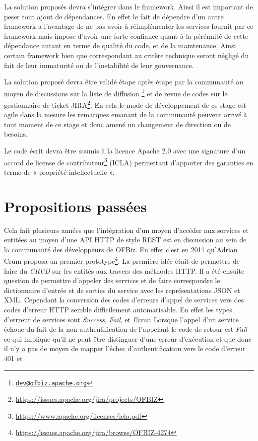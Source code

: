 \documentclass[a4paper, 11pt]{report}
\begin{document}
La solution proposés devra s'intégrer dans le framework. Ainsi il est
important de peser tout ajout de dépendances.  En effet le fait de
dépendre d'un autre framework a l'avantage de ne pas avoir à
réimplémenter les services fournit par ce framework mais impose
d'avoir une forte confiance quant à la pérénnité de cette dépendance
autant en terme de qualité du code, et de la maintenance.  Ainsi
certain framework bien que correspondant au critère technique seront
négligé du fait de leur immaturité ou de l'instabilité de leur
gouvernance.

La solution proposé devra être validé étape après étape par la
communauté au moyen de discussions sur la liste de diffusion
\footnote{\href{mailto:dev@ofbiz.apache.org}{\nolinkurl{dev@ofbiz.apache.org}}}
et de revue de codes sur le gestionnaire de ticket
JIRA\footnote{\url{https://issues.apache.org/jira/projects/OFBIZ}}. En
cela le mode de développement de ce stage est agile dans la mesure les
remarques emanant de la communauté peuvent arrivé à tout moment de ce
stage et donc amené un changement de direction ou de besoins.

Le code écrit devra être soumis à la licence Apache 2.0 avec une
signature d'un accord de license de
contributeur\footnote{\url{https://www.apache.org/licenses/icla.pdf}} (ICLA)
permettant d'apporter des garanties en terme de « propriété
intellectuelle ».

\section{Propositions passées}

Cela fait plusieurs années que l'intégration d'un moyen d'accéder aux
services et entitées au moyen d'une API HTTP de style REST est en
discussion au sein de la communauté des développeurs de OFBiz.  En
effet c'est en 2011 qu'Adrian Crum proposa un premier
prototype\footnote{\url{https://issues.apache.org/jira/browse/OFBIZ-4274}}. La
première idée était de permettre de faire du \emph{CRUD} sur les
entités aux travers des méthodes HTTP.  Il a été ensuite question de
permettre d'appeler des services et de faire correspondre le
dictionnaire d'entrée et de sorties du service avec les
représentations JSON et XML.  Cependant la conversion des codes
d'erreurs d'appel de services vers des codes d'erreur HTTP semble
difficilement automatisable.  En effet les types d'errreur de services
sont \emph{Success}, \emph{Fail}, et \emph{Error}.  Lorsque l'appel
d'un service échoue du fait de la non-authentification de l'appelant
le code de retour est \emph{Fail} ce qui implique qu'il ne peut être
distinguer d'une erreur d'exécution et que donc il n'y a pas de moyen
de mapper l'échec d'authentification vers le code d'erreur 401 et
\end{document}
